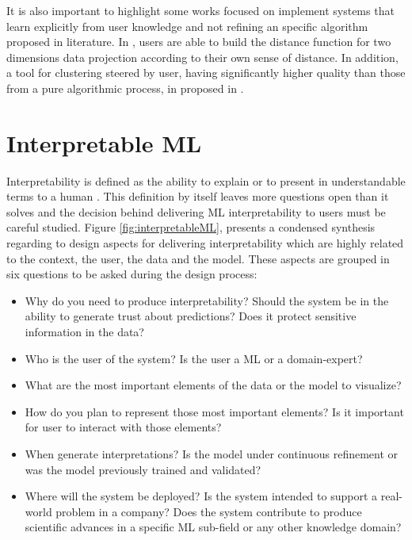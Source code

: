 It is also important to highlight some works focused on implement systems that learn explicitly from user knowledge and not refining an specific algorithm proposed in literature. In \cite{Brown2012}, users are able to build the distance function for two dimensions data projection according to their own sense of distance. In addition, a tool for clustering steered by user, having significantly higher quality than those from a pure algorithmic process, in proposed in \cite{Chang2016}.

\section{Interpretable ML} %
\label{section2.2}

Interpretability is defined as the ability to explain or to present in understandable terms to a human \cite{Doshi-Velez2017c}. This definition by itself leaves more questions open than it solves and the decision behind delivering ML interpretability to users must be careful studied. Figure \ref{fig:interpretableML}, presents a condensed synthesis regarding to design aspects for delivering interpretability which are highly related to the context, the user, the data and the model. These aspects are grouped in six questions to be asked during the design process:

\begin{itemize}
    \item Why do you need to produce interpretability? Should the system be in the ability to generate trust about predictions? Does it protect sensitive information in the data?
    \item Who is the user of the system? Is the user a ML or a domain-expert?
    \item What are the most important elements of the data or the model to visualize?
    \item How do you plan to represent those most important elements? Is it important for user to interact with those elements?
    \item When generate interpretations? Is the model under continuous refinement  or was the model previously trained and validated?
    \item Where will the system be deployed? Is the system intended to support a real-world problem in a company? Does the system contribute to produce scientific advances in a specific ML sub-field or any other knowledge domain?  
\end{itemize}

